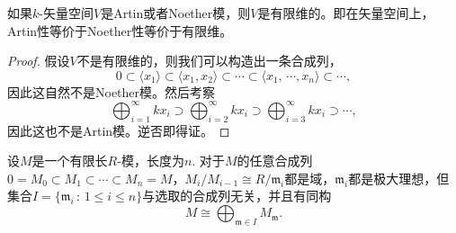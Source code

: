 \begin{pro}
如果$k$-矢量空间$V$是Artin或者Noether模，则$V$是有限维的。即在矢量空间上，Artin性等价于Noether性等价于有限维。
\end{pro}

\begin{proof}
	假设$V$不是有限维的，则我们可以构造出一条合成列，
	\[
	0\subset \langle x_1\rangle\subset \langle x_1,x_2\rangle\subset \cdots \subset \langle x_1,\,\cdots\!,x_n\rangle\subset \cdots,
	\]
	因此这自然不是Noether模。然后考察
	\[
		\bigoplus_{i=1}^\infty kx_i \supset \bigoplus_{i=2}^\infty kx_i \supset \bigoplus_{i=3}^\infty kx_i\supset \cdots,
	\]
	因此这也不是Artin模。逆否即得证。
\end{proof}

\begin{thm}
设$M$是一个有限长$R$-模，长度为$n$. 对于$M$的任意合成列$0=M_0\subset M_1\subset \cdots\subset M_n=M$，$M_i/M_{i-1}\cong R/\mathfrak{m}_i$都是域，$\mathfrak{m}_i$都是极大理想，但集合$I=\{\mathfrak{m}_i\,:\,1\leq i\leq n\}$与选取的合成列无关，并且有同构
\[
	M\cong \bigoplus_{\mathfrak{m}\in I} M_\mathfrak{m}.
\]
\end{thm}

